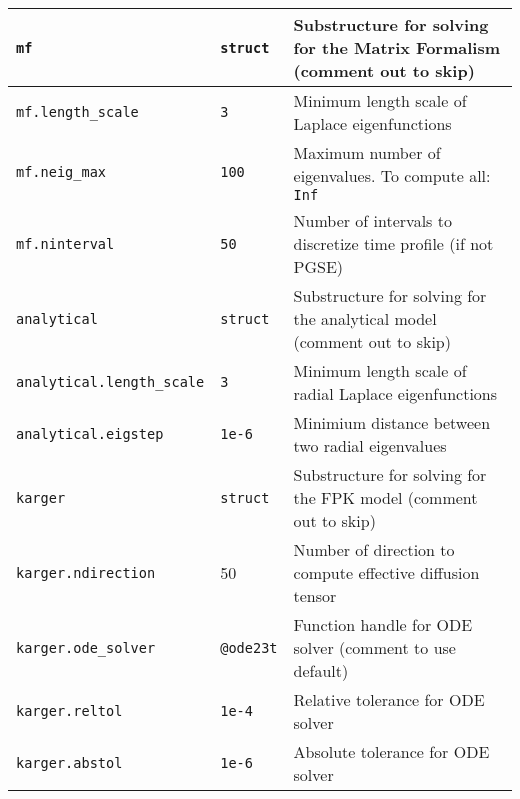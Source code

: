 \begin{tabular}{|l|l|p{6cm}|}
    \verb+mf+ & \verb+struct+ & Substructure for solving for the Matrix Formalism (comment out to skip)                                      \\ \hline
    \verb+mf.length_scale+ & \verb+3+ & Minimum length scale of Laplace eigenfunctions                                                               \\ \hline
    \verb+mf.neig_max+ & \verb+100+ & Maximum number of eigenvalues. To compute all: \verb+Inf+                                       \\ \hline
    \verb+mf.ninterval+ & \verb+50+ & Number of intervals to discretize time profile (if not PGSE)                                                 \\ \hline

    \verb+analytical+ & \verb+struct+ & Substructure for solving for the analytical model (comment out to skip)                                      \\ \hline
    \verb+analytical.length_scale+ & \verb+3+ & Minimum length scale of radial Laplace eigenfunctions                                                        \\ \hline
    \verb+analytical.eigstep+ & \verb+1e-6+ & Minimium distance between two radial eigenvalues                                                             \\ \hline

    \verb+karger+ & \verb+struct+ & Substructure for solving for the FPK model (comment out to skip)                                             \\ \hline
    \verb+karger.ndirection+ & 50                      & Number of direction to compute effective diffusion tensor                                                    \\ \hline
    \verb+karger.ode_solver+ & \verb+@ode23t+ & Function handle for ODE solver (comment to use default)                                                      \\ \hline
    \verb+karger.reltol+ & \verb+1e-4+ & Relative tolerance for ODE solver                                                                            \\ \hline
    \verb+karger.abstol+ & \verb+1e-6+ & Absolute tolerance for ODE solver                                                                            \\ \hline
\end{tabular}
